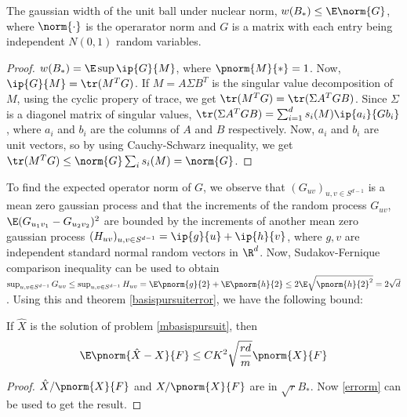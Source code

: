 \begin{proposition}
	The gaussian width of the unit ball under nuclear norm,
	$w(B_*) \leq \E \norm{G}$, where $\norm{\cdot}$ is the operarator norm
	and $G$ is a matrix with each entry being independent $N(0, 1)$
	random variables.
\end{proposition}
\begin{proof}
	$w(B_*) = \E\sup\ip{G}{M}$, where $\pnorm{M}{*} = 1$.
	Now, $\ip{G}{M} = \tr(M^TG)$. If $M = A\Sigma B^T$ is the
	singular value decomposition of $M$, using the cyclic propery
	of trace, we get $\tr(M^TG) = \tr(\Sigma A^T G B)$. Since
	$\Sigma$ is a diagonel matrix of singular values,
	$\tr(\Sigma A^T G B) = \sum_{i=1}^d s_i(M)\ip{a_i}{Gb_i}$,
	where $a_i$ and $b_i$ are the columns of $A$ and $B$ respectively.
	Now, $a_i$ and $b_i$ are unit vectors, so by using Cauchy-Schwarz
	inequality, we get $\tr(M^TG)\leq \norm{G}\sum_i s_i(M)=
	\norm{G}$.
\end{proof}

To find the expected operator norm of $G$, we observe that
$({G_{uv}})_{u,v\in S^{d-1}}$ is a mean zero gaussian process and that
the increments of the random process $G_{uv}$,
$\E(G_{u_1v_1}-G_{u_2v_2})^2$ are bounded by the
increments of another mean zero gaussian process
$(H_{uv})_{u,v\in S^{d-1}} = \ip{g}{u} + \ip{h}{v}$, where
$g, v$ are independent standard normal random vectors
in $\R^d$.
Now,
Sudakov-Fernique comparison inequality can be used to obtain
$\sup_{u,v\in S^{d-1}}G_{uv} \leq \sup_{u,v\in S^{d-1}}H_{uv} = \E\pnorm{g}{2}
+ \E\pnorm{h}{2}\leq 2\E\sqrt{\pnorm{h}{2}^2} = 2\sqrt{d}$.
Using this and 
theorem \ref{basispursuiterror}, we have
the following bound:
\begin{theorem}
	If $\hat{X}$ is the solution of problem
	\ref{mbasispursuit}, then
	\begin{equation*}
		\E \pnorm{\hat{X}-X}{F}\leq CK^2\sqrt{\frac{rd}{m}}
		\pnorm{X}{F}
	\end{equation*}
\end{theorem}

\begin{proof}
	$\hat{X}/\pnorm{X}{F}$ and $X/\pnorm{X}{F}$ are in
	$\sqrt{r}B_*$. Now \eqref{errorm} can be used to
	get the result.
\end{proof}
